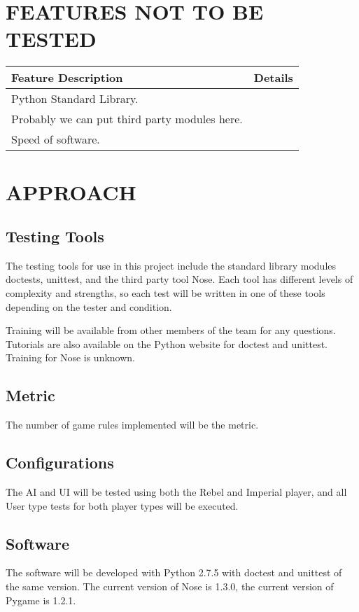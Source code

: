 \documentclass[report]{article}
\begin{document}
\section[FEATURES NOT TO BE TESTED]{FEATURES NOT TO BE TESTED}
\begin{center}
\begin{tabularx}{\textwidth}{| X | X |}
  \hline
  \textbf{Feature Description} &
    \textbf{Details} 
\\ \hline
 Python Standard Library.
 \\ \hline
 Probably we can put third party modules here.
 \\ \hline
 Speed of software.
\\ \hline
\end{tabularx}
\end{center}


\section[APPROACH]{APPROACH}
\subsection{Testing Tools}
The testing tools for use in this project include the standard library modules doctests, unittest, and the third party tool Nose. Each tool has different levels of complexity and strengths, so each test will be written in one of these tools depending on the tester and condition.

Training will be available from other members of the team for any questions. Tutorials are also available on the Python website for doctest and unittest. Training for Nose is unknown.

\subsection{Metric}
The number of game rules implemented will be the metric.

\subsection{Configurations}
The AI and UI will be tested using both the Rebel and Imperial player, and all User type tests for both player types will be executed.

\subsection{Software}
The software will be developed with Python 2.7.5 with doctest and unittest of the same version. The current version of Nose is 1.3.0, the current version of Pygame is 1.2.1.
\end{document}
